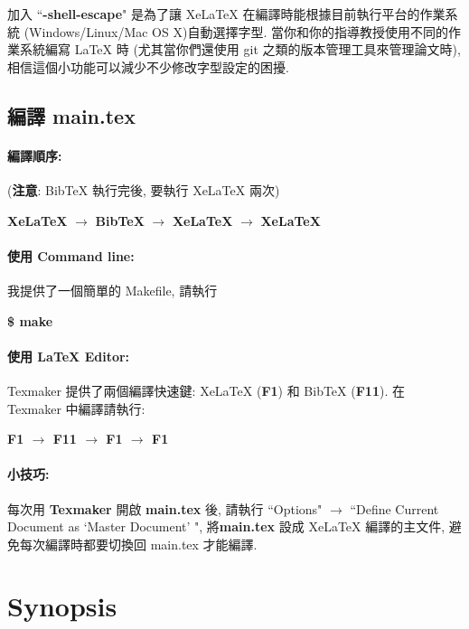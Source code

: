 加入 ``\textbf{-shell-escape}" 是為了讓 XeLaTeX 在編譯時能根據目前執行平台的作業系統 (Windows/Linux/Mac OS X)自動選擇字型.
當你和你的指導教授使用不同的作業系統編寫 LaTeX 時 (尤其當你們還使用 git 之類的版本管理工具來管理論文時), 相信這個小功能可以減少不少修改字型設定的困擾.

\subsection{編譯 main.tex}

\paragraph{編譯順序:} (\textbf{注意}: BibTeX 執行完後, 要執行 XeLaTeX 兩次)

\hspace{2em} \textbf{XeLaTeX} $\rightarrow$ \textbf{BibTeX} $\rightarrow$ \textbf{XeLaTeX} $\rightarrow$ \textbf{XeLaTeX}

\paragraph{使用 Command line:} 我提供了一個簡單的 Makefile, 請執行

\hspace{2em} \textbf{\$ make}

\paragraph{使用 LaTeX Editor:}
Texmaker 提供了兩個編譯快速鍵: XeLaTeX (\textbf{F1}) 和 BibTeX (\textbf{F11}).
在 Texmaker 中編譯請執行:

\hspace{2em} \textbf{F1 $\rightarrow$ F11 $\rightarrow$ F1 $\rightarrow$ F1}

\paragraph{小技巧:} 每次用 \textbf{Texmaker} 開啟 \textbf{main.tex} 後, 請執行 ``Options" $\rightarrow$ ``Define Current Document as `Master Document' ", 將\textbf{main.tex} 設成 XeLaTeX 編譯的主文件, 避免每次編譯時都要切換回 main.tex 才能編譯.

\section{Synopsis}

